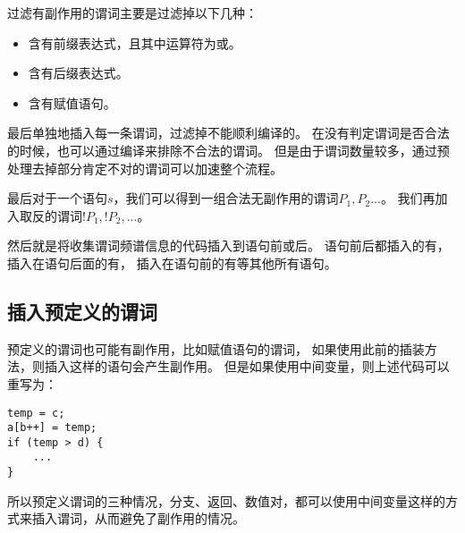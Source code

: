 过滤有副作用的谓词主要是过滤掉以下几种：
\begin{itemize}
\item 含有前缀表达式，且其中运算符为\mycode{++}或\mycode{--}。
\item 含有后缀表达式。
\item 含有赋值语句。
\end{itemize}

最后单独地插入每一条谓词，过滤掉不能顺利编译的。
在没有判定谓词是否合法的时候，也可以通过编译来排除不合法的谓词。
但是由于谓词数量较多，通过预处理去掉部分肯定不对的谓词可以加速整个流程。

最后对于一个语句$s$，我们可以得到一组合法无副作用的谓词${P_1,P_2...}$。
我们再加入取反的谓词${!P_1, !P_2, ...}$。

然后就是将收集谓词频谱信息的代码插入到语句前或后。
语句前后都插入的有，
插入在语句后面的有，
插入在语句前的有等其他所有语句。

\subsection{插入预定义的谓词}

预定义的谓词也可能有副作用，比如赋值语句的谓词，
如果使用此前的插装方法，则插入这样的语句会产生副作用。
但是如果使用中间变量，则上述代码可以重写为：
\lstset{language=Java}
\begin{lstlisting}
temp = c;
a[b++] = temp;
if (temp > d) {
    ...
}
\end{lstlisting}
所以预定义谓词的三种情况，分支、返回、数值对，都可以使用中间变量这样的方式来插入谓词，从而避免了副作用的情况。

